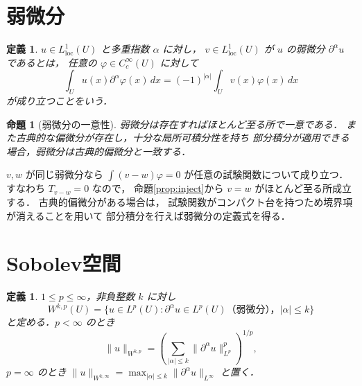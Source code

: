 \documentclass[a5paper,10pt,onecolumn]{jsarticle}
\makeatletter
\theoremstyle{mathnotetheorem}
\newtheorem{definition}[theorem]{定義}
\newtheorem{proposition}[theorem]{命題}
\renewcommand{\proofname}{証明}
\renewenvironment{proof}[1][\proofname]{%
  \par\pushQED{\qed}\normalfont\topsep4\p@\@plus2\p@\relax
  \trivlist\item[\hskip\labelsep\bfseries #1]\ignorespaces
}{\popQED\endtrivlist\@endpefalse}
\newcommand{\norm}[1]{\lVert #1\rVert}
\makeatother
\begin{document}
\section{弱微分}

\begin{definition}
$u\in L^1_{\mathrm{loc}}(U)$ と多重指数 $\alpha$ に対し，
$v\in L^1_{\mathrm{loc}}(U)$ が $u$ の\emph{弱微分}
$\partial^\alpha u$ であるとは，
任意の $\varphi\in C_c^\infty(U)$ に対して
\[
 \int_Uu(x)\partial^\alpha\varphi(x)\,dx
 =(-1)^{|\alpha|}\int_Uv(x)\varphi(x)\,dx
\]
が成り立つことをいう．
\end{definition}

\begin{proposition}[弱微分の一意性]\label{prop:weak-unique}
弱微分は存在すればほとんど至る所で一意である．
また古典的な偏微分が存在し，十分な局所可積分性を持ち
部分積分が適用できる場合，弱微分は古典的偏微分と一致する．
\end{proposition}
\begin{proof}
$v,w$ が同じ弱微分なら
$\int(v-w)\varphi=0$ が任意の試験関数について成り立つ．
すなわち $T_{v-w}=0$ なので，
命題\ref{prop:inject}から $v=w$ がほとんど至る所成立する．
古典的偏微分がある場合は，
試験関数がコンパクト台を持つため境界項が消えることを用いて
部分積分を行えば弱微分の定義式を得る．
\end{proof}

\section{Sobolev空間}

\begin{definition}
$1\le p\le\infty$，非負整数 $k$ に対し
\[
 W^{k,p}(U)=
 \{u\in L^p(U):
 \partial^\alpha u\in L^p(U)\text{（弱微分），}
 |\alpha|\le k\}
\]
と定める．$p<\infty$ のとき
\[
 \norm u_{W^{k,p}}
 =\left(\sum_{|\alpha|\le k}
      \norm{\partial^\alpha u}_{L^p}^p\right)^{1/p},
\]
$p=\infty$ のとき
$\norm u_{W^{k,\infty}}
 =\max_{|\alpha|\le k}\norm{\partial^\alpha u}_{L^\infty}$
と置く．
\end{definition}
\end{document}
